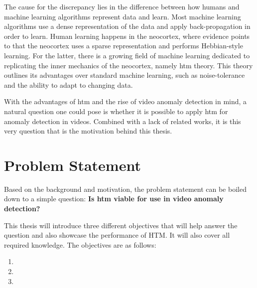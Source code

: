 \par
The cause for the discrepancy lies in the difference between how humans and machine learning algorithms represent data and learn. Most machine learning algorithms use a dense representation of the data and apply back-propagation in order to learn. Human learning happens in the neocortex, where evidence points to that the neocortex uses a sparse representation and performs Hebbian-style learning. For the latter, there is a growing field of machine learning dedicated to replicating the inner mechanics of the neocortex, namely  \gls*{htm} theory. This theory outlines its advantages over standard machine learning, such as noise-tolerance and the ability to adapt to changing data.
\par
With the advantages of  \gls*{htm} and the rise of video anomaly detection in mind, a natural question one could pose is whether it is possible to apply  \gls*{htm} for anomaly detection in videos. Combined with a lack of related works, it is this very question that is the motivation behind this thesis.

\section{Problem Statement}
\label{sec:problem_statement}
Based on the background and motivation, the problem statement can be boiled down to a simple question: \textbf{Is \gls*{htm} viable for use in video anomaly detection?}\par
This thesis will introduce three different objectives that will help answer the question and also showcase the performance of HTM. It will also cover all required knowledge. The objectives are as follows:
\begin{enumerate}
    \item {}
    \item {}
    \item {}
\end{enumerate}

